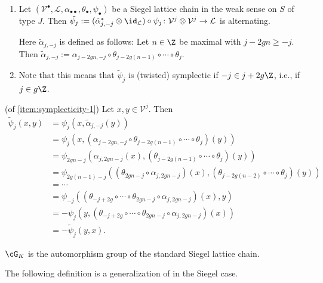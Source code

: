 \documentclass[a4paper]{scrartcl} %
\numberwithin{equation}{section}
\begin{document}
\begin{Remarks}\label{symplecticity}
  \begin{enumerate}[(1)]
  \item \label{item:symplecticity-1} Let $(\mathcal{V}^\bullet,\mathcal{L},\alpha_{\bullet\bullet},\theta_\bullet,\psi_\bullet)$ be a Siegel lattice chain in the weak sense on $S$ of type $J$. Then
    $\tilde{\psi_j}:=(\tilde{\alpha}_{j,-j}^*\otimes\id_{\mathcal{L}})\circ \psi_j\colon \mathcal{V}^j\otimes\mathcal{V}^j \to \mathcal{L}$ is alternating.
    
    Here $\tilde{\alpha}_{j,-j}$ is defined as follows: Let $n\in\Z$ be maximal with $j-2gn\geq -j$. Then $\tilde{\alpha}_{j,-j}:=\alpha_{j-2gn,-j}\circ \theta_{j-2g(n-1)}\circ\dotsb\circ \theta_j$.
  \item \label{item:symplecticity-2} Note that this means that $\tilde{\psi}_j$ is (twisted) symplectic if $-j\in j+2g\Z$, i.e., if $j\in g\Z$.
  \end{enumerate}
\end{Remarks}

\begin{Proof} (of \eqref{item:symplecticity-1})
  Let $x,y\in\mathcal{V}^j$. Then
  \begin{align*}
    \tilde{\psi}_j(x,y)
    &= \psi_j(x,\tilde{\alpha}_{j,-j}(y)) \\
    &= \psi_j(x,(\alpha_{j-2gn,-j}\circ \theta_{j-2g(n-1)}\circ\dotsb\circ \theta_j)(y)) \\
    &= \psi_{2gn-j}(\alpha_{j,2gn-j}(x),(\theta_{j-2g(n-1)}\circ\dotsb\circ \theta_j)(y)) \\
    &= \psi_{2g(n-1)-j}((\theta_{2gn-j}\circ\alpha_{j,2gn-j})(x),(\theta_{j-2g(n-2)}\circ\dotsb\circ \theta_j)(y)) \\
    &= \dotsb \\
    &= \psi_{-j}((\theta_{-j+2g}\circ\dotsb\circ\theta_{2gn-j}\circ\alpha_{j,2gn-j})(x),y) \\
    &= -\psi_{j}(y,(\theta_{-j+2g}\circ\dotsb\circ\theta_{2gn-j}\circ\alpha_{j,2gn-j})(x)) \\
    &= -\tilde{\psi}_j(y,x).
  \end{align*}
\end{Proof}


\begin{Reminder}
  $\cG_K$ is the automorphism group of the standard Siegel lattice chain.
\end{Reminder}


The following definition is a generalization of \cite[Definition~3.1]{vieh-wed} in the Siegel case.
\end{document}
